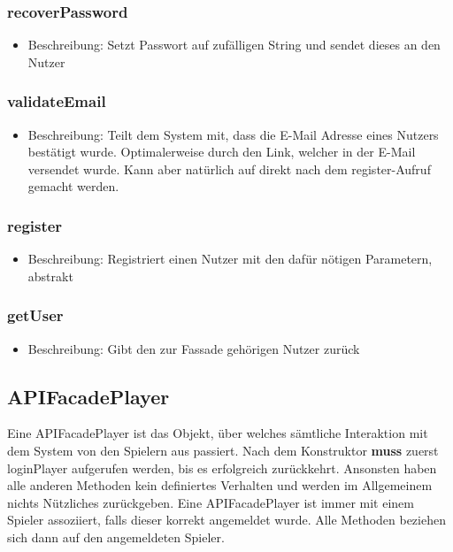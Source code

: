 \documentclass[a4paper]{scrreprt}
\begin{document}
		\subsubsection{recoverPassword}
		\begin{itemize}
		\item Beschreibung: Setzt Passwort auf zufälligen String und sendet dieses an den Nutzer
		\end{itemize}
		\subsubsection{validateEmail}
		    \begin{itemize}
		        \item Beschreibung: Teilt dem System mit, dass die E-Mail Adresse eines Nutzers bestätigt wurde. Optimalerweise durch den Link, welcher in der E-Mail versendet wurde. Kann aber natürlich auf direkt nach dem register-Aufruf gemacht werden.
		    \end{itemize}
	\subsubsection{register}
	\begin{itemize}
	\item Beschreibung: Registriert einen Nutzer mit den dafür nötigen Parametern, abstrakt
	\end{itemize}
	\subsubsection{getUser}
	\begin{itemize}
	\item Beschreibung: Gibt den zur Fassade gehörigen Nutzer zurück
	\end{itemize}
	
	\subsection{APIFacadePlayer}
	Eine APIFacadePlayer ist das Objekt, über welches sämtliche Interaktion mit dem System von den Spielern aus passiert. Nach dem Konstruktor \textbf{muss} zuerst loginPlayer aufgerufen werden, bis es erfolgreich zurückkehrt. Ansonsten haben alle anderen Methoden kein definiertes Verhalten und werden im Allgemeinem nichts Nützliches zurückgeben. Eine APIFacadePlayer ist immer mit einem Spieler assoziiert, falls dieser korrekt angemeldet wurde. Alle Methoden beziehen sich dann auf den angemeldeten Spieler.
	
\end{document}
